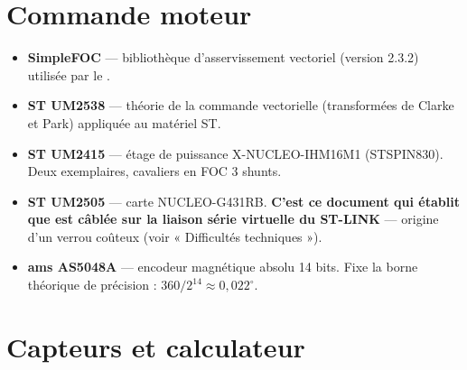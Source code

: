 \documentclass[11pt,a4paper]{article}
\begin{document}
\newpage
\section{Commande moteur}

\begin{itemize}[leftmargin=*]
  \item \textbf{SimpleFOC} \cite{simplefoc} — bibliothèque d'asservissement vectoriel
        (version 2.3.2) utilisée par le .

  \item \textbf{ST UM2538} \cite{st_um2538_focsdk} — théorie de la commande vectorielle
        (transformées de Clarke et Park) appliquée au matériel ST.

  \item \textbf{ST UM2415} \cite{st_um2415_ihm16m1} — étage de puissance
        X-NUCLEO-IHM16M1 (STSPIN830). Deux exemplaires, cavaliers en FOC 3 shunts.

  \item \textbf{ST UM2505} \cite{st_um2505_nucleog431} — carte NUCLEO-G431RB.
        \textbf{C'est ce document qui établit que  est câblée sur la liaison
        série virtuelle du ST-LINK} — origine d'un verrou coûteux (voir « Difficultés
        techniques »).

  \item \textbf{ams AS5048A} \cite{ams_as5048a} — encodeur magnétique absolu 14 bits.
        Fixe la borne théorique de précision : $360/2^{14} \approx 0{,}022^\circ$.
\end{itemize}

\section{Capteurs et calculateur}
\end{document}
